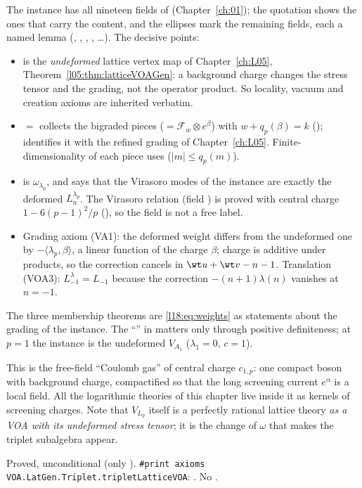 \begin{dictionary}
The instance has all nineteen fields of  (Chapter~\ref{ch:01}); the
quotation shows the ones that carry the content, and the ellipses mark the remaining fields, each a
named lemma (, , ,
, \dots). The decisive points:
\begin{itemize}
\item {} is the \emph{undeformed} lattice vertex map  of
  Chapter~\ref{ch:L05}, Theorem~\ref{l05:thm:latticeVOAGen}: a background charge changes the
  stress tensor and the grading, not the operator product. So locality, vacuum and creation axioms
  are inherited verbatim.
\item {} $=$  collects the bigraded pieces 
  ($=\mathcal F_w\otimes e^\beta$) with $w+q_p(\beta)=k$ ();  identifies
  it with the refined grading  of Chapter~\ref{ch:L05}.
  Finite-dimensionality of each piece uses  ($|m|\le q_p(m)$).
\item {} is $\omega_{\lambda_p}$, and  says that the
  Virasoro modes of the instance are exactly the deformed $L^{\lambda_p}_n$. The Virasoro relation
  (field ) is proved with central charge $1-6(p-1)^2/p$
  (), so the field  is not a free label.
\item Grading axiom (VA1): the deformed weight differs from the undeformed one by $-\langle\lambda_p,\beta\rangle$, a
  linear function of the charge $\beta$; charge is additive under products, so the correction cancels
  in $\wt u+\wt v-n-1$. Translation (VOA3): $L^\lambda_{-1}=L_{-1}$ because the correction
  $-(n+1)\lambda(n)$ vanishes at $n=-1$.
\end{itemize}
The three membership theorems are \eqref{l18:eq:weights} as statements about the grading of the
instance. The ``'' in  matters only through positive
definiteness; at $p=1$ the instance is the undeformed $V_{A_1}$ ($\lambda_1=0$, $c=1$).
\end{dictionary}
\begin{physics}
This is the free-field ``Coulomb gas'' of central charge $c_{1,p}$: one compact boson with
background charge, compactified so that the long screening current $e^{\alpha}$ is a local field. All
the logarithmic theories of this chapter live inside it as kernels of screening charges. Note that
$V_{L_p}$ itself is a perfectly rational lattice theory \emph{as a VOA with its undeformed stress
tensor}; it is the change of $\omega$ that makes the triplet subalgebra appear.
\end{physics}
\begin{status}
Proved, unconditional (only ). \texttt{\#print axioms VOA.LatGen.Triplet.tripletLatticeVOA}:
. No .
\end{status}

